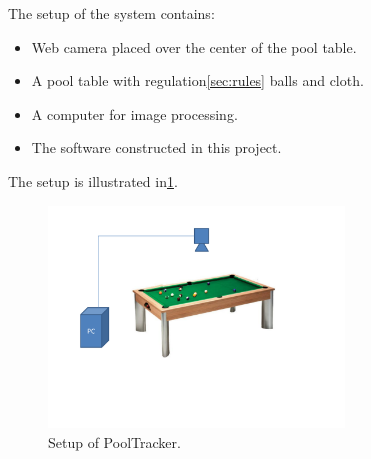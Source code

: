 The setup of the system contains:
\begin{itemize}
	\item Web camera placed over the center of the pool table.
	\item A pool table with regulation\ref{sec:rules} balls and cloth.
	\item A computer for image processing.
	\item The software constructed in this project.
\end{itemize}

The setup is illustrated in\ref{fig:setup}.

\begin{figure}[H]
\begin{center}
\leavevmode
\includegraphics[width=0.7\textwidth]{images/setup}
\end{center}
\caption{Setup of PoolTracker.}
\label{fig:setup}
\end{figure}